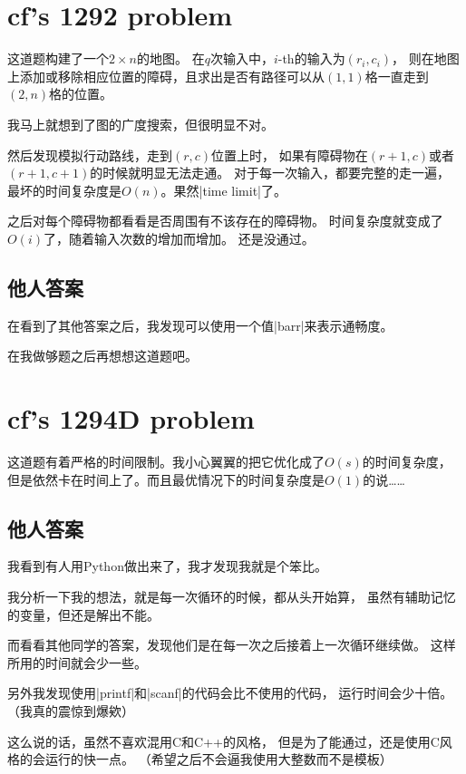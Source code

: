 \section{cf's 1292 problem}

这道题构建了一个$2\times n$的地图。
在$q$次输入中，$i$-th的输入为$(r_i, c_i)$，
则在地图上添加或移除相应位置的障碍，且求出是否有路径可以从$(1, 1)$格一直走到
$(2, n)$格的位置。

我马上就想到了图的广度搜索，但很明显不对。

然后发现模拟行动路线，走到$(r, c)$位置上时，
如果有障碍物在$(r+1, c)$或者$(r+1, c+1)$的时候就明显无法走通。
对于每一次输入，都要完整的走一遍，
最坏的时间复杂度是$O(n)$。果然\vb|time limit|了。

之后对每个障碍物都看看是否周围有不该存在的障碍物。
时间复杂度就变成了$O(i)$了，随着输入次数的增加而增加。
还是没通过。

\subsection{他人答案}
在看到了其他答案之后，我发现可以使用一个值\vb|barr|来表示通畅度。

在我做够题之后再想想这道题吧。


\section{cf's 1294D problem}

这道题有着严格的时间限制。我小心翼翼的把它优化成了$O(s)$的时间复杂度，
但是依然卡在时间上了。而且最优情况下的时间复杂度是$O(1)$的说\ldots\ldots

\subsection{他人答案}
我看到有人用Python做出来了，我才发现我就是个笨比。

我分析一下我的想法，就是每一次循环的时候，都从头开始算，
虽然有辅助记忆的变量，但还是解出不能。

而看看其他同学的答案，发现他们是在每一次之后接着上一次循环继续做。
这样所用的时间就会少一些。

另外我发现使用\vb|printf|和\vb|scanf|的代码会比不使用的代码，
运行时间会少十倍。（我真的震惊到爆欸）

这么说的话，虽然不喜欢混用C和C++的风格，
但是为了能通过，还是使用C风格的会运行的快一点。
（希望之后不会逼我使用大整数而不是模板）


